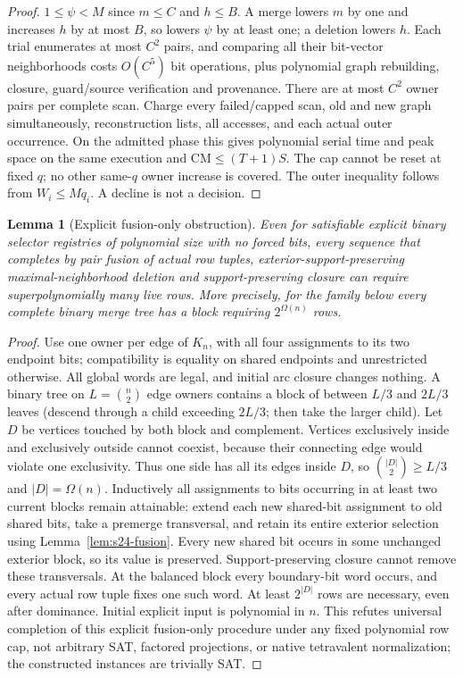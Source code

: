 \documentclass[11pt]{article}
\newtheorem{lemma}[theorem]{Lemma}
\begin{document}
\begin{proof}
$1\le\psi<M$ since $m\le C$ and $h\le B$. A merge lowers $m$ by one and increases $h$ by at most $B$, so lowers $\psi$ by at least one; a deletion lowers $h$. Each trial enumerates at most $C^2$ pairs, and comparing all their bit-vector neighborhoods costs $O(C^5)$ bit operations, plus polynomial graph rebuilding, closure, guard/source verification and provenance. There are at most $C^2$ owner pairs per complete scan. Charge every failed/capped scan, old and new graph simultaneously, reconstruction lists, all accesses, and each actual outer occurrence. On the admitted phase this gives polynomial serial time and peak space on the same execution and $\mathrm{CM}\le(T+1)S$. The cap cannot be reset at fixed $q$; no other same-$q$ owner increase is covered. The outer inequality follows from $W_i\le Mq_i$. A decline is not a decision.
\end{proof}
\begin{lemma}[Explicit fusion-only obstruction]\label{lem:s24-fusion-barrier}
Even for satisfiable explicit binary selector registries of polynomial size with no forced bits, every sequence that completes by pair fusion of actual row tuples, exterior-support-preserving maximal-neighborhood deletion and support-preserving closure can require superpolynomially many live rows. More precisely, for the family below every complete binary merge tree has a block requiring $2^{\Omega(n)}$ rows.
\end{lemma}
\begin{proof}
Use one owner per edge of $K_n$, with all four assignments to its two endpoint bits; compatibility is equality on shared endpoints and unrestricted otherwise. All global words are legal, and initial arc closure changes nothing. A binary tree on $L=\binom n2$ edge owners contains a block of between $L/3$ and $2L/3$ leaves (descend through a child exceeding $2L/3$; then take the larger child). Let $D$ be vertices touched by both block and complement. Vertices exclusively inside and exclusively outside cannot coexist, because their connecting edge would violate one exclusivity. Thus one side has all its edges inside $D$, so $\binom{|D|}2\ge L/3$ and $|D|=\Omega(n)$. Inductively all assignments to bits occurring in at least two current blocks remain attainable: extend each new shared-bit assignment to old shared bits, take a premerge transversal, and retain its entire exterior selection using Lemma~\ref{lem:s24-fusion}. Every new shared bit occurs in some unchanged exterior block, so its value is preserved. Support-preserving closure cannot remove these transversals. At the balanced block every boundary-bit word occurs, and every actual row tuple fixes one such word. At least $2^{|D|}$ rows are necessary, even after dominance. Initial explicit input is polynomial in $n$. This refutes universal completion of this explicit fusion-only procedure under any fixed polynomial row cap, not arbitrary SAT, factored projections, or native tetravalent normalization; the constructed instances are trivially SAT.
\end{proof}
\end{document}
